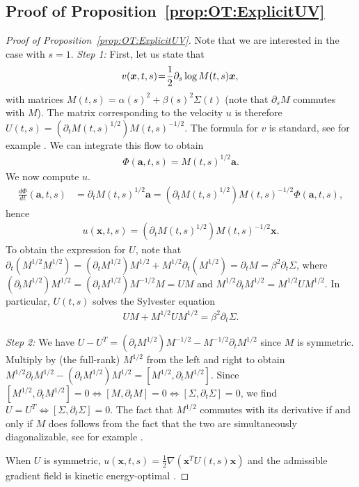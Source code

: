 \documentclass{article}
\newcommand{\bfx}{\boldsymbol{x}}
\newcommand{\bfa}{\boldsymbol{a}}
\theoremstyle{definition}
\theoremstyle{plain}
\theoremstyle{definition}
\theoremstyle{remark}
\newcommand{\Flow}{\Phi}
\begin{document}
\subsection{Proof of Proposition~\ref{prop:OT:ExplicitUV}}
\begin{proof}[Proof of Proposition~\ref{prop:OT:ExplicitUV}] Note that we are interested in the case with $s = 1$. 
\emph{Step 1:}
First, let us state that
    \begin{equation}
    v(\bfx, t, s)\hspace*{-0.07cm} =\hspace*{-0.07cm} \frac{1}{2} \partial_s \log M(t, s) \bfx,\, 
    \end{equation}
    with matrices $M(t,s) = \alpha(s)^2 + \beta(s)^2 \Sigma(t)$ (note that $\partial_s M$ commutes with $M$). The matrix corresponding to the velocity $u$ is therefore $U(t, s) = (\partial_t M(t, s)^{1/2}) M(t, s)^{-1/2}$.
    The formula for $v$ is standard, see for example \citep[Proposition 3.9]{chen_lipschitz-guided_2025}. We can integrate this flow to obtain
    \begin{align}
        \Flow(\bfa, t, s) = M(t, s)^{1/2} \bfa.
    \end{align}
    We now compute $u$.
    \begin{align}
        \frac{d \Flow}{dt}(\bfa, t, s) &= \partial_t M(t, s)^{1/2} \bfa
        = \left( \partial_t M(t, s)^{1/2} \right) M(t, s)^{-1/2} \Flow(\bfa, t, s),
    \end{align}
    hence
    \begin{align}
        u(\bfx, t, s) = \left( \partial_t M(t, s)^{1/2} \right) M(t, s)^{-1/2} \bfx.
    \end{align}
    To obtain the expression for $U$, note that $\partial_t( M^{1/2} M^{1/2}) = (\partial_t M^{1/2}) M^{1/2} + M^{1/2} \partial_t(M^{1/2}) = \partial_t M = \beta^2 \partial_t \Sigma$, where $(\partial_t M^{1/2}) M^{1/2} = (\partial_t M^{1/2}) M^{-1/2} M = U M$ and $M^{1/2} \partial_t M^{1/2} = M^{1/2} U M^{1/2}$.  In particular, $U(t, s)$ solves the Sylvester equation
    \begin{align}
        UM + M^{1/2} U M^{1/2} = \beta^2 \partial_t \Sigma.
    \end{align}

    \emph{Step 2:}  We have $U - U^T = (\partial_t M^{1/2}) M^{-1/2} - M^{-1/2} \partial_t M^{1/2}$ since $M$ is symmetric. Multiply by (the full-rank) $M^{1/2}$ from the left and right to obtain
    $M^{1/2} \partial_t M^{1/2} - (\partial_t M^{1/2}) M^{1/2} = [M^{1/2}, \partial_t M^{1/2}]$. Since $[M^{1/2}, \partial_t M^{1/2}] = 0 \Leftrightarrow [M, \partial_t M] = 0 \Leftrightarrow [\Sigma, \partial_t \Sigma] = 0$, we find $U = U^T \Leftrightarrow [\Sigma, \partial_t \Sigma] = 0$. The fact that $M^{1/2}$ commutes with its derivative if and only if $M$ does follows from the fact that the two are simultaneously diagonalizable, see for example \citep[Chapter 3]{higham_functions_2008}.
    
    When $U$ is symmetric, $u(\bfx, t, s) = \frac 1 2 \nabla ( \bfx^T U(t, s) \bfx)$ and the admissible gradient field is kinetic energy-optimal \citep[Proposition 8.4.3]{ambrosio_gradient_2005}.
\end{proof}
\end{document}
